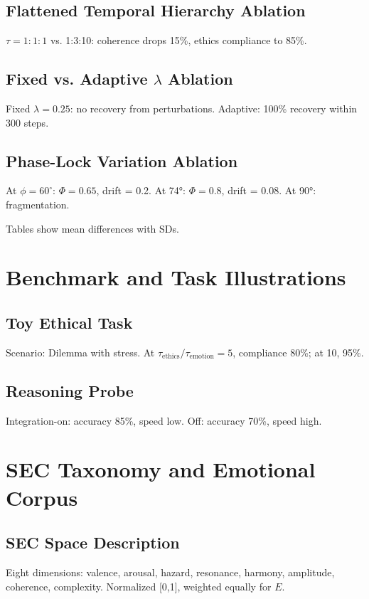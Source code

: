 \documentclass[11pt,a4paper]{article}
\begin{document}
\subsection{Flattened Temporal Hierarchy Ablation}
\(\tau = 1:1:1\) vs. 1:3:10: coherence drops 15\%, ethics compliance to 85\%.

\subsection{Fixed vs. Adaptive \texorpdfstring{\(\lambda\)}{lambda} Ablation}
Fixed \(\lambda = 0.25\): no recovery from perturbations. Adaptive: 100\% recovery within 300 steps.

\subsection{Phase-Lock Variation Ablation}
At \(\phi = 60^\circ\): \(\Phi = 0.65\), drift = 0.2. At 74°: \(\Phi = 0.8\), drift = 0.08. At 90°: fragmentation.

Tables show mean differences with SDs.

\section{Benchmark and Task Illustrations}
\label{app:benchmarks}

\subsection{Toy Ethical Task}
Scenario: Dilemma with stress. At \(\tau_{\text{ethics}}/\tau_{\text{emotion}} = 5\), compliance 80\%; at 10, 95\%.

\subsection{Reasoning Probe}
Integration-on: accuracy 85\%, speed low. Off: accuracy 70\%, speed high.

\section{SEC Taxonomy and Emotional Corpus}
\label{app:sec}

\subsection{SEC Space Description}
Eight dimensions: valence, arousal, hazard, resonance, harmony, amplitude, coherence, complexity. Normalized [0,1], weighted equally for \(E\).
\end{document}
